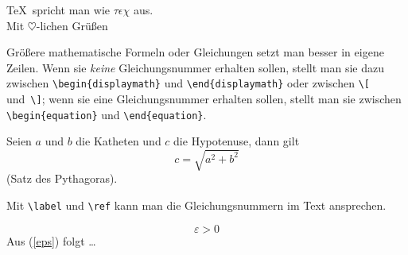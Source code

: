\begin{LTXexample}
\TeX\ spricht man wie
 $\tau\epsilon\chi$ aus.\\
Mit $\heartsuit$-lichen
 Grü\ss en
\end{LTXexample}


Größere mathematische Formeln oder Gleichungen setzt man besser
in eigene Zeilen. Wenn sie \emph{keine} Gleichungsnummer erhalten
sollen, stellt man sie dazu zwischen \lstinline|\begin{displaymath}| und
\lstinline|\end{displaymath}| oder zwischen \lstinline|\[| und~\lstinline|\]|;
wenn sie eine Gleichungsnummer erhalten sollen, stellt man sie
zwischen \lstinline|\begin{equation}| und \lstinline|\end{equation}|.

\begin{LTXexample}
Seien $a$ und $b$ die Katheten
und $c$ die Hypotenuse,
dann gilt
\begin{equation}
c = \sqrt{  a^{2}+b^{2}  }
\end{equation}
(Satz des Pythagoras).
\end{LTXexample}


Mit \lstinline|\label| und \lstinline|\ref| kann man die Gleichungsnummern
im Text ansprechen.

\let\origlabel\label
\begin{LTXexample}[preset=\let\label\origlabel]
\begin{equation} \label{eps}
\varepsilon > 0
\end{equation}
 Aus (\ref{eps}) folgt \dots
\end{LTXexample}




